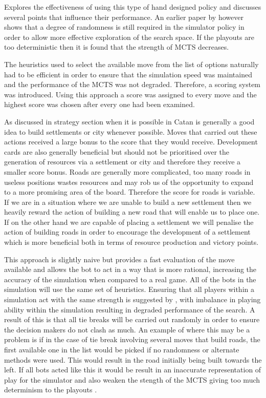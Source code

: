 \documentclass[]{article}
\begin{document}
\par \textcite{silver2009monte} Explores the effectiveness of using this type of hand designed policy and discusses several points that influence their performance. An earlier paper by \textcite{silver2007reinforcement} however shows that a degree of randomness is still required in the simulator policy in order to allow more effective exploration of the search space. If the playouts are too deterministic then it is found that the strength of MCTS decreases. 

\par The heuristics used to select the available move from the list of options naturally had to be efficient in order to ensure that the simulation speed was maintained and the performance of the MCTS was not degraded. Therefore, a scoring system was introduced. Using this approach a score was assigned to every move and the highest score was chosen after every one had been examined. 

\par As discussed in strategy section when it is possible in Catan is generally a good idea to build settlements or city whenever possible. Moves that carried out these actions received a large bonus to the score that they would receive. Development cards are also generally beneficial but should not be prioritised over the generation of resources via a settlement or city and therefore they receive a smaller score bonus. Roads are generally more complicated, too many roads in useless positions wastes resources and may rob us of the opportunity to expand to a more promising area of the board. Therefore the score for roads is variable. If we are in a situation where we are unable to build a new settlement then we heavily reward the action of building a new road that will enable us to place one. If on the other hand we are capable of placing a settlement we will penalise the action of building roads in order to encourage the development of a settlement which is more beneficial both in terms of resource production and victory points.

\par This approach is slightly naive but provides a fast evaluation of the move available and allows the bot to act in a way that is more rational, increasing the accuracy of the simulation when compared to a real game. All of the bots in the simulation will use the same set of heuristics. Ensuring that all players within a simulation act with the same strength is suggested by \textcite{gelly2006modification}, with imbalance in playing ability within the simulation resulting in degraded performance of the search. A result of this is that all tie breaks will be carried out randomly in order to ensure the decision makers do not clash as much. An example of where this may be a problem is if in the case of tie break involving several moves that build roads, the first available one in the list would be picked if no randomness or alternate methods were used. This would result in the road initially being built towards the left. If all bots acted like this it would be result in an inaccurate representation of play for the simulator and also weaken the stength of the MCTS giving too much determinism to the playouts \autocite{silver2007reinforcement}.   
\end{document}
